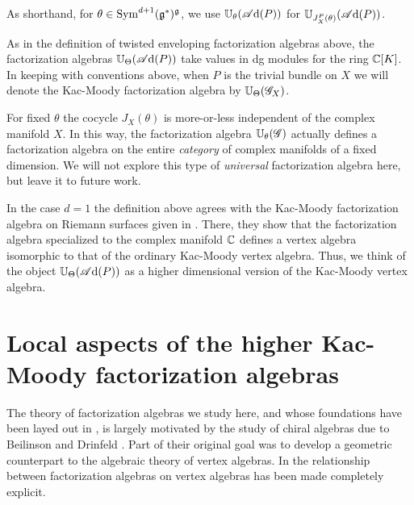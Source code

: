 \documentclass[10pt]{amsart}
\def\sAd{\sA{\rm d}}
\begin{document}
As shorthand, for $\theta \in {\rm Sym}^{d+1}(\mathfrak g^*)^\mathfrak g$, 
we use $\UU_\theta (\sAd(P))$ for $\UU_{J_X^P (\theta)} (\sAd(P))$. 

\begin{rmk} 
As in the definition of twisted enveloping factorization algebras above, the factorization algebras $\UU_\Theta(\sAd(P))$ take values in dg modules for the ring $\mathbb C[K]$. 
In keeping with conventions above, when $P$ is the trivial bundle on $X$ we will denote the Kac-Moody factorization algebra by $\mathbb U_\Theta(\mathscr G_X)$. 
\end{rmk}

\begin{rmk}
For fixed $\theta$ the cocycle $J_X(\theta)$ is more-or-less independent of the complex manifold $X$.
In this way, the factorization algebra $\mathbb U_\theta (\mathscr G)$ actually defines a factorization algebra on the entire {\em category} of complex manifolds of a fixed dimension.
We will not explore this type of {\em universal} factorization algebra here, but leave it to future work.
\end{rmk}

In the case $d = 1$ the definition above agrees with the Kac-Moody factorization algebra on Riemann surfaces given in \cite{CG1}.
There, they show that the factorization algebra specialized to the complex manifold $\mathbb C$ defines a vertex algebra isomorphic to that of the ordinary Kac-Moody vertex algebra.
Thus, we think of the object $\UU_\Theta(\sAd(P))$ as a higher dimensional version of the Kac-Moody vertex algebra.

\section{Local aspects of the higher Kac-Moody factorization algebras} 
\label{sec: sphere ops}

The theory of factorization algebras we study here, and whose foundations have been layed out in \cite{CG1}, is largely motivated by the study of chiral algebras due to Beilinson and Drinfeld \cite{BD}.
Part of their original goal was to develop a geometric counterpart to the algebraic theory of vertex algebras. 
In \cite{CG1} the relationship between factorization algebras on vertex algebras has been made completely explicit. 
\end{document}
